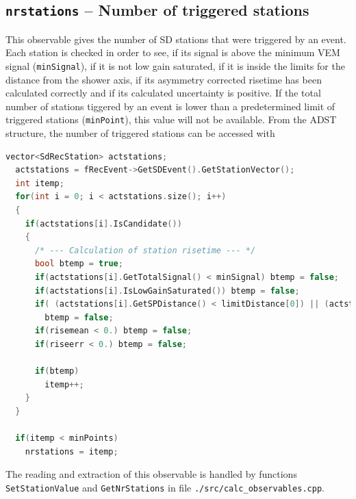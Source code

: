 \documentclass[12pt,a4paper]{report}
\begin{document}
\subsection{\texttt{nrstations} -- Number of triggered stations}
This observable gives the number of SD stations that were triggered by an event. Each station is checked in order to see, if its signal is above the minimum VEM signal (\texttt{minSignal}), if it is not low gain saturated, if it is inside the limits for the distance from the shower axis, if its asymmetry corrected risetime has been calculated correctly and if its calculated uncertainty is positive. If the total number of stations tiggered by an event is lower than a predetermined limit of triggered stations (\texttt{minPoint}), this value will not be available. From the ADST structure, the number of triggered stations can be accessed with
\begin{lstlisting}[language=C++]
  vector<SdRecStation> actstations;
  actstations = fRecEvent->GetSDEvent().GetStationVector();
  int itemp;
  for(int i = 0; i < actstations.size(); i++)
  {
    if(actstations[i].IsCandidate())
    {
      /* --- Calculation of station risetime --- */
      bool btemp = true;
      if(actstations[i].GetTotalSignal() < minSignal) btemp = false;
      if(actstations[i].IsLowGainSaturated()) btemp = false;
      if( (actstations[i].GetSPDistance() < limitDistance[0]) || (actstations[i].GetSPDistance() > limitDistance[1]))
        btemp = false;
      if(risemean < 0.) btemp = false;
      if(riseerr < 0.) btemp = false;

      if(btemp)
        itemp++;
    }
  }

  if(itemp < minPoints)
    nrstations = itemp;
\end{lstlisting}
The reading and extraction of this observable is handled by functions \texttt{SetStationValue} and \texttt{GetNrStations} in file \texttt{./src/calc\_observables.cpp}.
\end{document}
